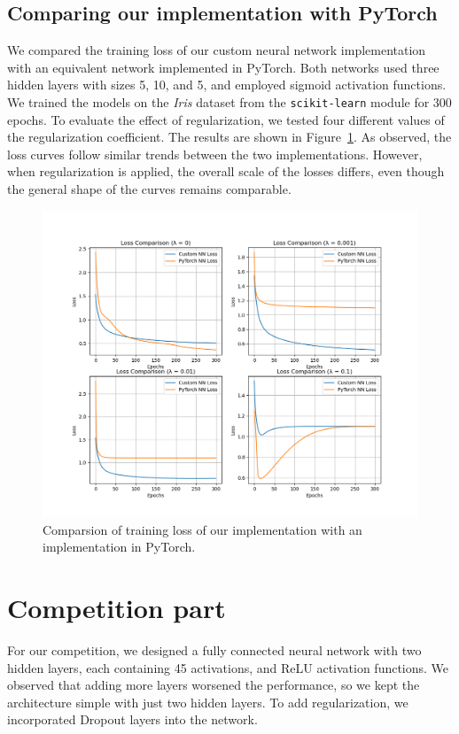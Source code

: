 \documentclass[9pt]{IEEEtran}
\begin{document}
\subsection{Comparing our implementation with PyTorch}
We compared the training loss of our custom neural network implementation with an equivalent network implemented in PyTorch. Both networks used three hidden layers with sizes 5, 10, and 5, and employed sigmoid activation functions. We trained the models on the \textit{Iris} dataset from the \texttt{scikit-learn} module for 300 epochs. To evaluate the effect of regularization, we tested four different values of the regularization coefficient. The results are shown in Figure~\ref{fig:pytorch}. As observed, the loss curves follow similar trends between the two implementations. However, when regularization is applied, the overall scale of the losses differs, even though the general shape of the curves remains comparable.

\begin{figure}[h]
    \centering
    \includegraphics[width=1\columnwidth]{figures/pytorch_comparison.png}
    \caption{Comparsion of training loss of our implementation with an implementation in PyTorch.}
    \label{fig:pytorch}
\end{figure}


\section{Competition part}
For our competition, we designed a fully connected neural network with two hidden layers, each containing 45 activations, and ReLU activation functions. We observed that adding more layers worsened the performance, so we kept the architecture simple with just two hidden layers. To add regularization, we incorporated Dropout layers into the network.
\end{document}
